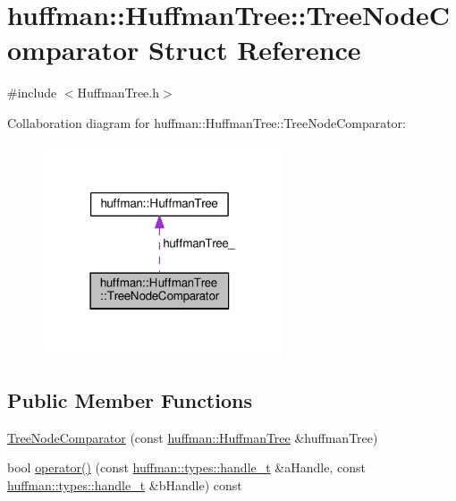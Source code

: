 \hypertarget{structhuffman_1_1HuffmanTree_1_1TreeNodeComparator}{}\section{huffman\+:\+:Huffman\+Tree\+:\+:Tree\+Node\+Comparator Struct Reference}
\label{structhuffman_1_1HuffmanTree_1_1TreeNodeComparator}


{\ttfamily \#include $<$Huffman\+Tree.\+h$>$}



Collaboration diagram for huffman\+:\+:Huffman\+Tree\+:\+:Tree\+Node\+Comparator\+:\nopagebreak
\begin{figure}[H]
\begin{center}
\leavevmode
\includegraphics[width=202pt]{structhuffman_1_1HuffmanTree_1_1TreeNodeComparator__coll__graph}
\end{center}
\end{figure}
\subsection*{Public Member Functions}
\begin{DoxyCompactItemize}
\item 
\hyperlink{structhuffman_1_1HuffmanTree_1_1TreeNodeComparator_af7a98f1e7a01c6a239c13fc980fb0de7}{Tree\+Node\+Comparator} (const \hyperlink{classhuffman_1_1HuffmanTree}{huffman\+::\+Huffman\+Tree} \&huffman\+Tree)
\item 
bool \hyperlink{structhuffman_1_1HuffmanTree_1_1TreeNodeComparator_a24a7c95bd79dc7e189c2bed39ebece01}{operator()} (const \hyperlink{namespacehuffman_1_1types_a41dc8ca07e19043152b0a5c8b5fec90b}{huffman\+::types\+::handle\+\_\+t} \&a\+Handle, const \hyperlink{namespacehuffman_1_1types_a41dc8ca07e19043152b0a5c8b5fec90b}{huffman\+::types\+::handle\+\_\+t} \&b\+Handle) const 
\end{DoxyCompactItemize}
